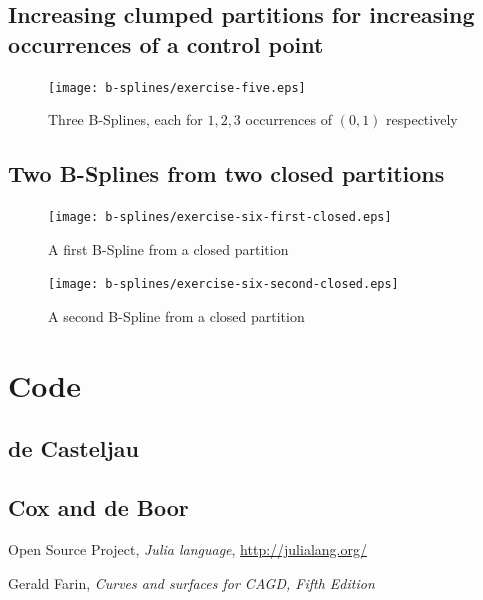 \documentclass{article}
\begin{document}
\subsection{Increasing clumped partitions for increasing occurrences of a control point}

\begin{figure}[h!]
  \centering
  \texttt{[image: b-splines/exercise-five.eps]}
  \caption{Three B-Splines, each for $1,2,3$ occurrences of $(0,1)$ respectively }
  \label{fig:bspline-exercise-five}
\end{figure}

\subsection{Two B-Splines from two closed partitions}
\begin{figure}[h!]
  \centering
  \texttt{[image: b-splines/exercise-six-first-closed.eps]}
  \caption{A first B-Spline from a closed partition }
  \label{fig:bspline-exercise-six-first}
\end{figure}

\begin{figure}[h!]
  \centering
  \texttt{[image: b-splines/exercise-six-second-closed.eps]}
  \caption{A second B-Spline from a closed partition }
  \label{fig:bspline-exercise-six-second}
\end{figure}


\section{Code}

\subsection{de Casteljau}
\label{sec:deCasteljau-code}


\subsection{Cox and de Boor}
\label{sec:Cox-deBoor-code}


\newpage

\begin{thebibliography}{}

 Open Source Project,
  \emph{Julia language}, \url{http://julialang.org/}

 Gerald Farin,
  \textit{Curves and surfaces for CAGD, Fifth Edition}


\end{thebibliography}
\end{document}
